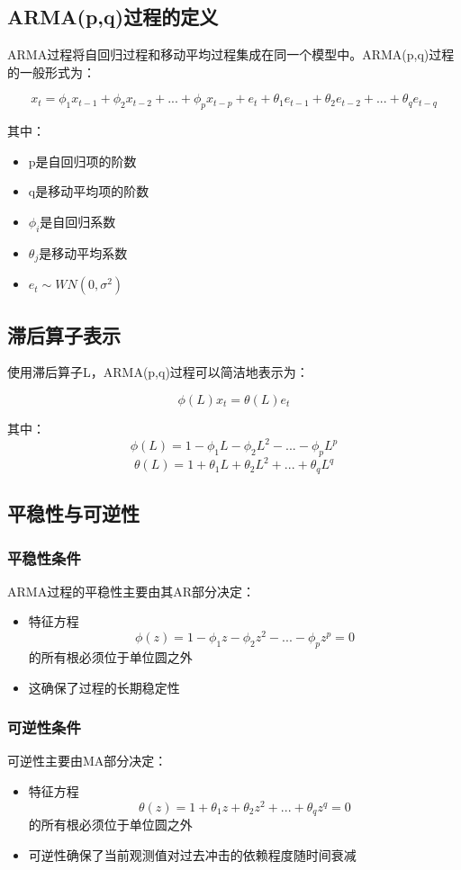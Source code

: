 \subsection{ARMA(p,q)过程的定义}
ARMA过程将自回归过程和移动平均过程集成在同一个模型中。ARMA(p,q)过程的一般形式为：

\[x_t = \phi_1x_{t-1} + \phi_2x_{t-2} + ... + \phi_px_{t-p} + e_t + \theta_1e_{t-1} + \theta_2e_{t-2} + ... + \theta_qe_{t-q}\]

其中：
\begin{itemize}
    \item p是自回归项的阶数
    \item q是移动平均项的阶数
    \item \(\phi_i\)是自回归系数
    \item \(\theta_j\)是移动平均系数
    \item \(e_t \sim WN(0,\sigma^2)\)
\end{itemize}

\subsection{滞后算子表示}
使用滞后算子L，ARMA(p,q)过程可以简洁地表示为：

\[\phi(L)x_t = \theta(L)e_t\]

其中：
\[\phi(L) = 1 - \phi_1L - \phi_2L^2 - ... - \phi_pL^p\]
\[\theta(L) = 1 + \theta_1L + \theta_2L^2 + ... + \theta_qL^q\]

\subsection{平稳性与可逆性}
\subsubsection{平稳性条件}
ARMA过程的平稳性主要由其AR部分决定：
\begin{itemize}
    \item 特征方程\[\phi(z) = 1 - \phi_1z - \phi_2z^2 - ... - \phi_pz^p = 0\]的所有根必须位于单位圆之外
    \item 这确保了过程的长期稳定性
\end{itemize}

\subsubsection{可逆性条件}
可逆性主要由MA部分决定：
\begin{itemize}
    \item 特征方程\[\theta(z) = 1 + \theta_1z + \theta_2z^2 + ... + \theta_qz^q = 0\]的所有根必须位于单位圆之外
    \item 可逆性确保了当前观测值对过去冲击的依赖程度随时间衰减
\end{itemize}


